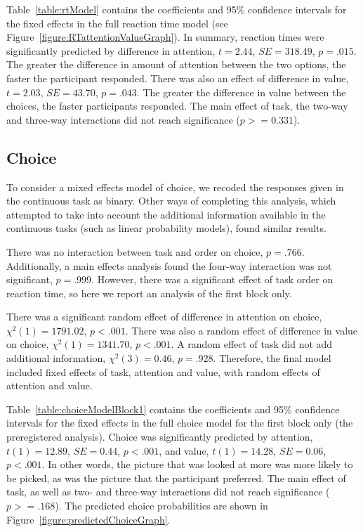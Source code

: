 \documentclass[12pt]{article}
\begin{document}
Table~\ref{table:rtModel} contains the coefficients and 95\% confidence intervals for the fixed effects in the full reaction time model (see Figure~\ref{figure:RTattentionValueGraph}). In summary, reaction times were significantly predicted by difference in attention, $t=2.44$, $SE=318.49$, $p=.015$. The greater the difference in amount of attention between the two options, the faster the participant responded. There was also an effect of difference in value, $t=2.03$, $SE=43.70$, $p=.043$. The greater the difference in value between the choices, the faster participants responded. The main effect of task, the two-way and three-way interactions did not reach significance ($p>=0.331$). 

\subsection{Choice}
To consider a mixed effects model of choice, we recoded the responses given in the continuous task as binary. Other ways of completing this analysis, which attempted to take into account the additional information available in the continuous tasks (such as linear probability models), found similar results. 

There was no interaction between task and order on choice, $p=.766$. Additionally, a main effects analysis found the four-way interaction was not significant, $p=.999$. However, there was a significant effect of task order on reaction time, so here we report an analysis of the first block only. 

There was a significant random effect of difference in attention on choice, $\chi^2(1)=1791.02$, $p<.001$. There was also a random effect of difference in value on choice, $\chi^2(1)=1341.70$, $p<.001$. A random effect of task did not add additional information, $\chi^2(3)=0.46$, $p=.928$. Therefore, the final model included fixed effects of task, attention and value, with random effects of attention and value.

Table~\ref{table:choiceModelBlock1} contains the coefficients and 95\% confidence intervals for the fixed effects in the full choice model for the first block only (the preregistered analysis). Choice was significantly predicted by attention, $t(1)=12.89$, $SE=0.44$, $p<.001$, and value, $t(1)=14.28$, $SE=0.06$, $p<.001$. In other words, the picture that was looked at more was more likely to be picked, as was the picture that the participant preferred. The main effect of task, as well as two- and three-way interactions did not reach significance ($p>=.168$). The predicted choice probabilities are shown in Figure~\ref{figure:predictedChoiceGraph}.
\end{document}
